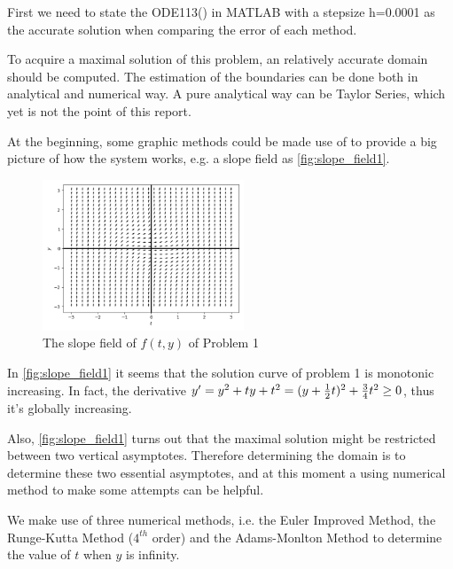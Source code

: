 \documentclass[a4paper]{article}
\begin{document}
	First we need to state the ODE113() in MATLAB with a stepsize h=0.0001 as the accurate solution when comparing the error of each method.
	
	To acquire a maximal solution of this problem, an relatively accurate domain should be computed. The estimation of the boundaries can be done both in analytical and numerical way. A pure analytical way can be Taylor Series, which yet is not the point of this report.
	
	At the beginning, some graphic methods could be made use of to provide a big picture of how the system works, e.g. a slope field as \autoref{fig:slope_field1}.
	
	\begin{figure}[H]
		\centering
		\includegraphics[width=6cm]{img/slope_field1.png}
		\caption{\label{fig:slope_field1} The slope field of $f(t, y)$ of Problem 1}
	\end{figure}
	
	In \autoref{fig:slope_field1} it seems that the solution curve of problem 1 is monotonic increasing. In fact, the derivative $y' = y^2 + ty + t^2 = (y + {1 \over 2}t)^2 + {3 \over 4}t^2 \geq 0$, thus it's globally increasing.
	
	Also, \autoref{fig:slope_field1} turns out that the maximal solution might be restricted between two vertical asymptotes. Therefore determining the domain is to determine these two essential asymptotes, and at this moment a using numerical method to make some attempts can be helpful.
	
	We make use of three numerical methods, i.e. the Euler Improved Method, the Runge-Kutta Method ($4^{th}$ order) and the Adams-Monlton Method to determine the value of $t$ when $y$ is infinity.
	
\end{document}
